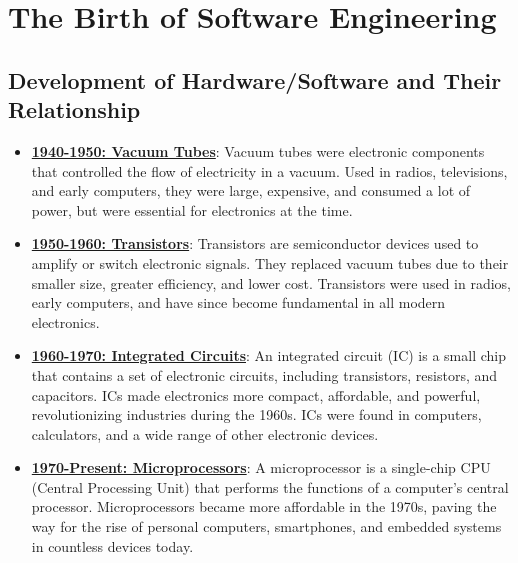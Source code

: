 \section{The Birth of Software Engineering}

\subsection{Development of Hardware/Software and Their Relationship}

\begin{itemize} \item \textbf{\underline{1940-1950: Vacuum Tubes}}:
Vacuum tubes were electronic components that controlled the flow of electricity in a vacuum. Used in radios, televisions, and early computers, they were large, expensive, and consumed a lot of power, but were essential for electronics at the time.



\item \textbf{\underline{1950-1960: Transistors}}:  
Transistors are semiconductor devices used to amplify or switch electronic signals. They replaced vacuum tubes due to their smaller size, greater efficiency, and lower cost. Transistors were used in radios, early computers, and have since become fundamental in all modern electronics.

\item \textbf{\underline{1960-1970: Integrated Circuits}}:  
An integrated circuit (IC) is a small chip that contains a set of electronic circuits, including transistors, resistors, and capacitors. ICs made electronics more compact, affordable, and powerful, revolutionizing industries during the 1960s. ICs were found in computers, calculators, and a wide range of other electronic devices.

\item \textbf{\underline{1970-Present: Microprocessors}}:  
A microprocessor is a single-chip CPU (Central Processing Unit) that performs the functions of a computer's central processor. Microprocessors became more affordable in the 1970s, paving the way for the rise of personal computers, smartphones, and embedded systems in countless devices today.

\end{itemize}

\vspace{0.5cm}
\begin{center}
\end{center}
\vspace{1.5cm}

